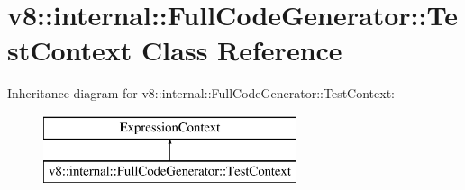 \hypertarget{classv8_1_1internal_1_1_full_code_generator_1_1_test_context}{}\section{v8\+:\+:internal\+:\+:Full\+Code\+Generator\+:\+:Test\+Context Class Reference}
\label{classv8_1_1internal_1_1_full_code_generator_1_1_test_context}
Inheritance diagram for v8\+:\+:internal\+:\+:Full\+Code\+Generator\+:\+:Test\+Context\+:\begin{figure}[H]
\begin{center}
\leavevmode
\includegraphics[height=2.000000cm]{classv8_1_1internal_1_1_full_code_generator_1_1_test_context}
\end{center}
\end{figure}
